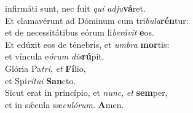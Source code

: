 \evenverse infirmáti sunt, nec fuit \textit{qui} \textit{ad}\textit{ju}\textbf{vá}ret.\\
\oddverse Et clamavérunt ad Dóminum cum tri\textit{bu}\textit{la}\textbf{rén}tur:~\*\\
\oddverse et de necessitátibus eórum li\textit{be}\textit{rá}\textit{vit} \textbf{e}os.\\
\evenverse Et edúxit eos de ténebris, et \textit{um}\textit{bra} \textbf{mor}tis:~\*\\
\evenverse et víncula e\textit{ó}\textit{rum} \textit{dis}\textbf{rú}pit.\\
\oddverse Glória Pa\textit{tri}, \textit{et} \textbf{Fí}lio,~\*\\
\oddverse et Spi\textit{rí}\textit{tu}\textit{i} \textbf{San}cto.\\
\evenverse Sicut erat in princípio, et \textit{nunc}, \textit{et} \textbf{sem}per,~\*\\
\evenverse et in sǽcula sæ\textit{cu}\textit{ló}\textit{rum}. \textbf{A}men.\\
